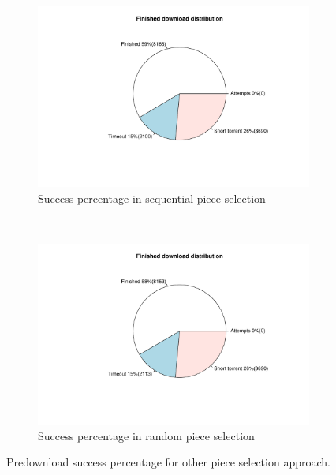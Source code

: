 \begin{figure}[h!]
		\begin{subfigure}[t]{0.5\textwidth}
			\centering
			\includegraphics[width=\textwidth]{pics/results/dpredown_sequential.pdf}
			\caption{Success percentage in sequential piece selection}
			\label{fig:predownpseq}
		\end{subfigure}
		~
		\begin{subfigure}[t]{0.5\textwidth}
			\centering
			\includegraphics[width=\textwidth]{pics/results/dpredown_random.pdf}
			\caption{Success percentage in random piece selection}
			\label{fig:predownprandom}
		\end{subfigure}
		\caption{Predownload success percentage for other piece selection approach.}
\end{figure}

